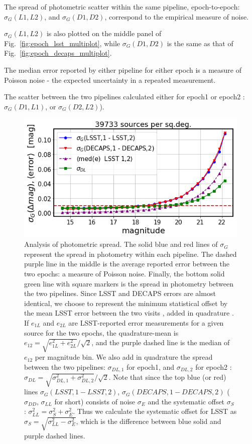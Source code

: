 \documentclass[DM,lsstdraft,toc,usenatbib]{lsstdoc}
\begin{document}
The spread of photometric scatter within the same pipeline, epoch-to-epoch: $\sigma_{G}(L1, L2)$, and $\sigma_{G}(D1,D2)$, correspond to the empirical measure of noise. 

$\sigma_{G}(L1, L2)$  is also plotted on the middle panel of Fig.~\ref{fig:epoch_lsst_multiplot}, while  $\sigma_{G}(D1,D2)$ is the same as that of Fig.~\ref{fig:epoch_decaps_multiplot}. 

The median error reported by either pipeline for either epoch is a measure of Poisson noise - the expected uncertainty in a repeated measurement. 

The scatter between the two pipelines calculated either for epoch1 or epoch2 :  $\sigma_{G}(D1,L1)$, or $\sigma_{G}(D2,L2)$). 


\begin{figure}
\begin{centering}
\includegraphics[width=0.8\columnwidth]{figs/photometric_spread_2_525846-530012.png}
\caption{Analysis of  photometric spread. The solid blue and red lines of $\sigma_{G}$  represent the spread in photometry within each pipeline. The dashed purple line in the middle is the average reported error between the two epochs: a measure of Poisson noise. Finally, the bottom solid green line with square markers is the spread in photometry between the two pipelines.  Since LSST and DECAPS errors are almost identical, we choose to represent the minimum statistical offset by the mean LSST error between the two visits , added in quadrature . If $e_{1L}$ and $e_{2L}$ are LSST-reported error measurements for a given source for the two epochs,  the quadrature-mean is  $e_{12} = \sqrt{e_{1L}^{2} + e_{2L}^{2}} / \sqrt{2}$, and the purple dashed line is the median of $e_{12}$ per magnitude bin. We also add in quadrature the spread between the two pipelines: $\sigma_{DL,1}$ for epoch1, and $\sigma_{DL,2}$ for epoch2 : $\sigma_{DL} = \sqrt{\sigma_{DL,1}^{2} + \sigma_{DL,2}^{2}} / \sqrt{2}$.  Note that since the top blue (or red) lines $\sigma_{G}(LSST,1 - LSST,2)$, $\sigma_{G}(DECAPS,1 - DECAPS,2)$   ($\sigma_{DD}$, $\sigma_{LL}$ for short) consists of noise $\sigma_{E} $ and the systematic offset $\sigma_{S}$ : $\sigma_{LL}^{2} = \sigma_{S}^{2} + \sigma_{E}^{2}$. Thus we calculate the systematic offset for LSST as  $\sigma_{S} = \sqrt{\sigma_{LL}^2  - \sigma_{E}^{2}}$, which is the difference between  blue solid and purple dashed lines. 
}
\label{fig:spread}
\end{centering}
\end{figure} 
\end{document}
